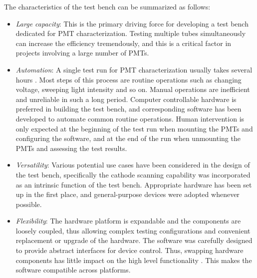 \documentclass{nst}
\providecommand{\DIFadd}[1]{{\protect\color{yellow} \sf #1}} %
\providecommand{\DIFaddbegin}{} %
\providecommand{\DIFaddend}{} %
\providecommand{\DIFdelbegin}{} %
\providecommand{\DIFdelend}{} %
\begin{document}
The characteristics of the test bench can be summarized as follows:
\begin{itemize}
	\item \textit{Large capacity}: This is the primary driving force for developing a test bench dedicated for PMT characterization.
	Testing multiple tubes simultaneously can increase the efficiency tremendously, and this is a critical factor in projects involving \DIFaddbegin \DIFadd{a }\DIFaddend large number of PMTs. 
	\item \textit{Automation}: A single test run for PMT characterization usually takes several hours\DIFdelbegin \DIFdelend \DIFaddbegin \DIFadd{. Most steps of this process are routine operations such as }\DIFaddend changing voltage, \DIFdelbegin \DIFdelend \DIFaddbegin \DIFadd{sweeping }\DIFaddend light intensity and so on.
	Manual operations are inefficient and unreliable in such a long period.
	Computer controllable hardware is preferred in building the test bench, and corresponding software has been developed to automate \DIFdelbegin \DIFdelend \DIFaddbegin \DIFadd{common routine operations.
	Human }\DIFaddend intervention is only expected at the beginning of the test run when mounting the PMTs and configuring the software, and at the end of the run when unmounting the PMTs and assessing the test results.
	\item \textit{Versatility}: Various potential use cases have been considered in the design of the test bench, specifically the cathode scanning capability \DIFdelbegin \DIFdelend \DIFaddbegin \DIFadd{was }\DIFaddend incorporated as an intrinsic function of the test bench.
	Appropriate hardware has been set up in the first place, and general-purpose devices \DIFdelbegin \DIFdelend \DIFaddbegin \DIFadd{were }\DIFaddend adopted whenever possible.
	\item \textit{Flexibility}: %
	The hardware platform is \DIFdelbegin \DIFdelend \DIFaddbegin \DIFadd{expandable }\DIFaddend and the components are loosely coupled, thus allowing complex testing configurations and convenient replacement or upgrade of the hardware.
	The software \DIFdelbegin \DIFdelend \DIFaddbegin \DIFadd{was carefully designed to provide abstract interfaces for device control. Thus, swapping hardware components has little impact on the }\DIFaddend high level functionality\DIFdelbegin \DIFdelend \DIFaddbegin \DIFadd{. This makes the software compatible across platforms.
}\DIFaddend \end{itemize}
\end{document}
